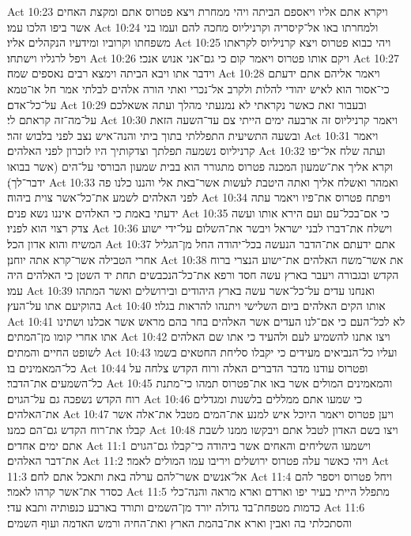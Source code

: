 Act 10:23  ויקרא אתם אליו ויאספם הביתה ויהי ממחרת ויצא פטרוס אתם ומקצת האחים אשר ביפו הלכו עמו׃
Act 10:24  ולמחרתו באו אל־קיסריה וקרניליוס מחכה להם ועמו בני משפחתו וקרוביו ומידעיו הנקהלים אליו׃
Act 10:25  ויהי כבוא פטרוס ויצא קרניליוס לקראתו ויפל לרגליו וישתחו׃
Act 10:26  ויקם אותו פטרוס ויאמר קום כי גם־אני אנוש אנכי׃
Act 10:27  וידבר אתו ויבא הביתה וימצא רבים נאספים שמה׃
Act 10:28  ויאמר אליהם אתם ידעתם כי־אסור הוא לאיש יהודי להלות ולקרב אל־נכרי ואתי הורה אלהים לבלתי אמר חל או־טמא על־כל־אדם׃
Act 10:29  ובעבור זאת כאשר נקראתי לא נמנעתי מהלך ועתה אשאלכם על־מה־זה קראתם לי׃
Act 10:30  ויאמר קרניליוס זה ארבעה ימים הייתי צם עד־השעה הזאת ובשעה התשיעית התפללתי בתוך ביתי והנה־איש נצב לפני בלבוש זהר׃
Act 10:31  ויאמר קרניליוס נשמעה תפלתך וצדקותיך היו לזכרון לפני האלהים׃
Act 10:32  ועתה שלח אל־יפו וקרא אליך את־שמעון המכנה פטרוס מתגורר הוא בבית שמעון הבורסי על־הים (אשר בבואו ידבר־לך)׃
Act 10:33  ואמהר ואשלח אליך ואתה היטבת לעשות אשר־באת אלי והננו כלנו פה לפני האלהים לשמע את־כל־אשר צוית ביהוה׃
Act 10:34  ויפתח פטרוס את־פיו ויאמר עתה ידעתי באמת כי האלהים איננו נשא פנים׃
Act 10:35  כי אם־בכל־עם ועם הירא אותו ועשה צדק רצוי הוא לפניו׃
Act 10:36  וישלח את־דברו לבני ישראל ויבשר את־השלום על־ידי ישוע המשיח והוא אדון הכל׃
Act 10:37  אתם ידעתם את־הדבר הנעשה בכל־יהודה החל מן־הגליל אחרי הטבילה אשר־קרא אתה יוחנן׃
Act 10:38  את אשר־משח האלהים את־ישוע הנצרי ברוח הקדש ובגבורה ויעבר בארץ עשה חסד ורפא את־כל־הנכבשים תחת יד השטן כי האלהים היה עמו׃
Act 10:39  ואנחנו עדים על־כל־אשר עשה בארץ היהודים ובירושלים ואשר המתהו בהוקיעם אתו על־העץ׃
Act 10:40  אותו הקים האלהים ביום השלישי ויתנהו להראות בגלוי׃
Act 10:41  לא לכל־העם כי אם־לנו העדים אשר האלהים בחר בהם מראש אשר אכלנו ושתינו אתו אחרי קומו מן־המתים׃
Act 10:42  ויצו אתנו להשמיע לעם ולהעיד כי אתו שם האלהים לשופט החיים והמתים׃
Act 10:43  ועליו כל־הנביאים מעידים כי יקבלו סליחת החטאים בשמו כל־המאמינים בו׃
Act 10:44  ופטרוס עודנו מדבר הדברים האלה ורוח הקדש צלחה על כל־השמעים את־הדבר׃
Act 10:45  והמאמינים המולים אשר באו את־פטרוס תמהו כי־מתנת רוח הקדש נשפכה גם על־הגוים׃
Act 10:46  כי שמעו אתם ממללים בלשנות ומגדלים את־האלהים׃
Act 10:47  ויען פטרוס ויאמר היוכל איש למנע את־המים מטבל את־אלה אשר קבלו את־רוח הקדש גם־הם כמנו׃
Act 10:48  ויצו בשם האדון לטבל אתם ויבקשו ממנו לשבת אתם ימים אחדים׃
Act 11:1  וישמעו השליחים והאחים אשר ביהודה כי־קבלו גם־הגוים את־דבר האלהים׃
Act 11:2  ויהי כאשר עלה פטרוס ירושלים ויריבו עמו המולים לאמר׃
Act 11:3  אל־אנשים אשר־להם ערלה באת ותאכל אתם לחם׃
Act 11:4  ויחל פטרוס ויספר להם כסדר את־אשר קרהו לאמר׃
Act 11:5  מתפלל הייתי בעיר יפו וארדם וארא מראה והנה־כלי כדמות מטפחת־בד גדולה יורד מן־השמים ותורד בארבע כנפותיה ותבא עדי׃
Act 11:6  והסתכלתי בה ואבין וארא את־בהמת הארץ ואת־החיה ורמש האדמה ועוף השמים׃
